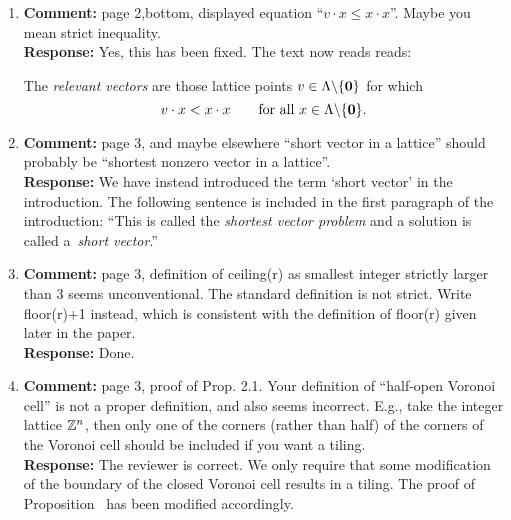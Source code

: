 \documentclass[a4paper,10pt]{article}
\begin{document}
\begin{enumerate}
\item\textbf{Comment:}  
page 2,bottom, displayed equation ``$v \cdot x \leq x \cdot x$''. Maybe you mean strict inequality.
\\\textbf{Response:}
Yes, this has been fixed.  The text now reads reads:

The \emph{relevant vectors} are those lattice points $v \in \Lambda \backslash  \{\boldsymbol{0}\}$ for which  
\[
v \cdot x < x \cdot x \qquad \text{for all $x \in \Lambda \backslash  \{\boldsymbol{0}\}$}.
\]



\item\textbf{Comment:}  
page 3, and maybe elsewhere ``short vector in a lattice'' should probably be ``shortest nonzero vector in a lattice''. 
\\\textbf{Response:}
We have instead introduced the term `short vector' in the introduction.  The following sentence is included in the first paragraph of the introduction: ``This is called the \emph{shortest vector problem} and a solution is called a~\emph{short vector}.''

\item\textbf{Comment:}  
page 3, definition of ceiling(r) as smallest integer strictly larger than 3 seems unconventional. The standard definition is not strict. Write floor(r)+1 instead, which is consistent with the definition of floor(r) given later in the paper. 
\\\textbf{Response:}
Done.

\item\textbf{Comment:}  \label{com:rev2halfopen}
page 3, proof of Prop. 2.1. Your definition of ``half-open Voronoi cell'' is not a proper definition, and also seems incorrect. E.g., take the integer lattice ${\mathbb Z}^n$, then only one of the corners (rather than half) of the corners of the Voronoi cell should be included if you want a tiling. 
\\\textbf{Response:}
The reviewer is correct.  We only require that some modification of the boundary of the closed Voronoi cell results in a tiling.  The proof of Proposition~ has been modified accordingly.


\end{enumerate}
\end{document}
